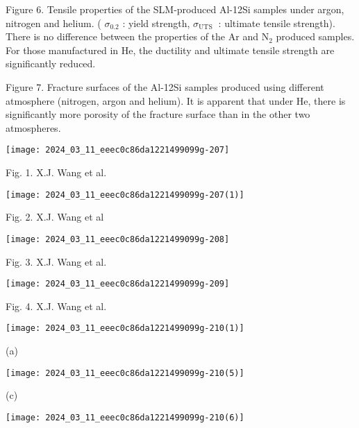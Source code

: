 \documentclass[10pt]{article}
\begin{document}
Figure 6. Tensile properties of the SLM-produced Al-12Si samples under argon, nitrogen and helium. ( $\sigma_{0.2}$ : yield strength, $\sigma_{\text {UTS }}$ : ultimate tensile strength). There is no difference between the properties of the $\mathrm{Ar}$ and $\mathrm{N}_{2}$ produced samples. For those manufactured in $\mathrm{He}$, the ductility and ultimate tensile strength are significantly reduced.

Figure 7. Fracture surfaces of the Al-12Si samples produced using different\\
atmosphere (nitrogen, argon and helium). It is apparent that under $\mathrm{He}$, there is significantly more porosity of the fracture surface than in the other two atmospheres.

\begin{center}
\texttt{[image: 2024\_03\_11\_eeec0c86da1221499099g-207]}
\end{center}

Fig. 1. X.J. Wang et al.

\begin{center}
\texttt{[image: 2024\_03\_11\_eeec0c86da1221499099g-207(1)]}
\end{center}

Fig. 2. X.J. Wang et al

\begin{center}
\texttt{[image: 2024\_03\_11\_eeec0c86da1221499099g-208]}
\end{center}

Fig. 3. X.J. Wang et al.

\begin{center}
\texttt{[image: 2024\_03\_11\_eeec0c86da1221499099g-209]}
\end{center}

Fig. 4. X.J. Wang et al.

\begin{center}
\texttt{[image: 2024\_03\_11\_eeec0c86da1221499099g-210(1)]}
\end{center}

(a)

\begin{center}
\texttt{[image: 2024\_03\_11\_eeec0c86da1221499099g-210(5)]}
\end{center}

(c)

\begin{center}
\texttt{[image: 2024\_03\_11\_eeec0c86da1221499099g-210(6)]}
\end{center}
\end{document}
